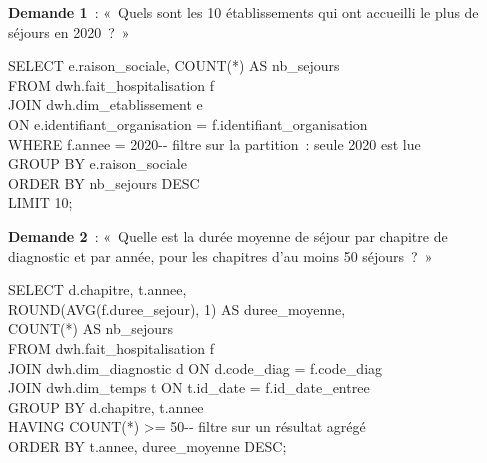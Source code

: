 \noindent \textbf{Demande 1}~: «~Quels sont les 10 établissements qui ont accueilli le plus de séjours en 2020~?~»

\begin{center}
\begin{minipage}{0.92\textwidth}
\begin{tcolorbox}[colback=title2!6,colframe=title1,boxsep=2pt]
\ttfamily\scriptsize
SELECT e.raison\_sociale, COUNT(*) AS nb\_sejours\\
FROM dwh.fait\_hospitalisation f\\
JOIN dwh.dim\_etablissement e\\
\hspace*{2em}ON e.identifiant\_organisation = f.identifiant\_organisation\\
WHERE f.annee = 2020\hspace*{6em}-{}- filtre sur la partition~: seule 2020 est lue\\
GROUP BY e.raison\_sociale\\
ORDER BY nb\_sejours DESC\\
LIMIT 10;
\end{tcolorbox}
\end{minipage}
\end{center}

\noindent \textbf{Demande 2}~: «~Quelle est la durée moyenne de séjour par chapitre de diagnostic et par année, pour les chapitres d'au moins 50 séjours~?~»

\begin{center}
\begin{minipage}{0.92\textwidth}
\begin{tcolorbox}[colback=title2!6,colframe=title1,boxsep=2pt]
\ttfamily\scriptsize
SELECT d.chapitre, t.annee,\\
\hspace*{3.2em}ROUND(AVG(f.duree\_sejour), 1) AS duree\_moyenne,\\
\hspace*{3.2em}COUNT(*) AS nb\_sejours\\
FROM dwh.fait\_hospitalisation f\\
JOIN dwh.dim\_diagnostic d ON d.code\_diag = f.code\_diag\\
JOIN dwh.dim\_temps \hspace*{0.6em}t ON t.id\_date = f.id\_date\_entree\\
GROUP BY d.chapitre, t.annee\\
HAVING COUNT(*) >= 50\hspace*{5.6em}-{}- filtre sur un résultat agrégé\\
ORDER BY t.annee, duree\_moyenne DESC;
\end{tcolorbox}
\end{minipage}
\end{center}

